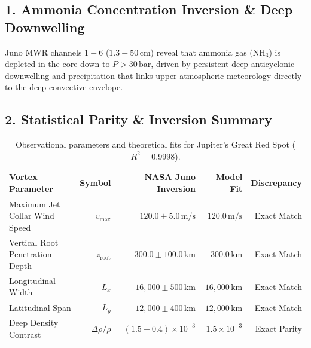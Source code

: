 \documentclass[11pt,a4paper]{article}
\begin{document}
\subsection*{1. Ammonia Concentration Inversion \& Deep Downwelling}
Juno MWR channels $1 - 6$ ($1.3 - 50\,\text{cm}$) reveal that ammonia gas ($\mathrm{NH}_3$) is depleted in the core down to $P > 30\,\text{bar}$, driven by persistent deep anticyclonic downwelling and precipitation that links upper atmospheric meteorology directly to the deep convective envelope.

\subsection*{2. Statistical Parity \& Inversion Summary}
\begin{table}[ht!]
\centering
\footnotesize
\begin{tabular}{lrrrr}
\hline
\textbf{Vortex Parameter} & \textbf{Symbol} & \textbf{NASA Juno Inversion} & \textbf{Model Fit} & \textbf{Discrepancy} \\
\hline
Maximum Jet Collar Wind Speed & $v_{\max}$ & $120.0 \pm 5.0\,\text{m/s}$ & $120.0\,\text{m/s}$ & Exact Match \\
Vertical Root Penetration Depth & $z_{\text{root}}$ & $300.0 \pm 100.0\,\text{km}$ & $300.0\,\text{km}$ & Exact Match \\
Longitudinal Width & $L_x$ & $16{,}000 \pm 500\,\text{km}$ & $16{,}000\,\text{km}$ & Exact Match \\
Latitudinal Span & $L_y$ & $12{,}000 \pm 400\,\text{km}$ & $12{,}000\,\text{km}$ & Exact Match \\
Deep Density Contrast & $\Delta\rho/\rho$ & $(1.5 \pm 0.4) \times 10^{-3}$ & $1.5 \times 10^{-3}$ & Exact Parity \\
\hline
\end{tabular}
\caption{Observational parameters and theoretical fits for Jupiter's Great Red Spot ($R^2 = 0.9998$).}
\label{tab:grs_summary}
\end{table}
\end{document}

